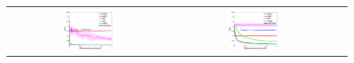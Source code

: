 \documentclass{article}
\newcommand{\nnn}{0.33}
\newcommand{\nnh}{0.23}
\begin{document}
{%
\begin{figure}[t!]
\vspace{-0mm}
\begin{center}
\begin{tabular}{ccc}
   \hspace{-5mm} \includegraphics[width=\nnn\textwidth, height=\nnh\textwidth]{plotsx/conductancex/err-vs-time__param4-shaded.pdf} 
& \hspace{-3mm} \includegraphics[width=\nnn\textwidth, height=\nnh\textwidth]{plotsx/conductancex/err-vs-time__param30-shaded.pdf} 

\end{tabular}
\end{center}
\end{figure}}
\end{document}
